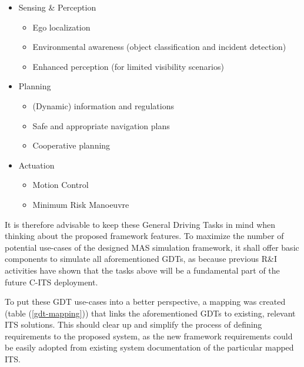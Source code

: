 \documentclass[main.tex]{subfiles}
\begin{document}
\begin{itemize}
    \item Sensing \& Perception
    \begin{itemize}
        \item Ego localization
        \item Environmental awareness (object classification and incident detection)
        \item Enhanced perception (for limited visibility scenarios)
    \end{itemize}
    \item Planning
    \begin{itemize}
        \item (Dynamic) information and regulations
        \item Safe and appropriate navigation plans
        \item Cooperative planning
    \end{itemize}
    \item Actuation
    \begin{itemize}
        \item Motion Control
        \item Minimum Risk Manoeuvre
    \end{itemize}
\end{itemize}

It is therefore advisable to keep these General Driving Tasks in mind when thinking about the proposed framework 
features. To maximize the number of potential use-cases of the designed MAS simulation framework, 
it shall offer basic components to simulate all aforementioned GDTs, as because previous R\&I
activities have shown that the tasks above will be a fundamental part of the future C-ITS deployment.

To put these GDT use-cases into a better perspective, a mapping was created (table
(\ref{gdt-mapping})) that links the aforementioned GDTs to existing, relevant ITS solutions.
This should clear up and simplify the process of defining requirements to the proposed system,
as the new framework requirements could be easily adopted from existing system documentation of
the particular mapped ITS.
\end{document}
